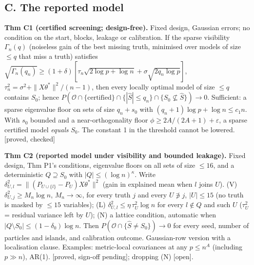 \documentclass[10pt]{article}
\newcommand{\st}[1]{\textsf{\small[#1]}}
\newcommand{\Shat}{\hat S}
\begin{document}
\subsection*{C. The reported model}
\textbf{Thm C1 (certified screening; design-free).} Fixed design, Gaussian errors; no condition on the start, blocks, leakage or calibration. If the sparse visibility $\Gamma_n(q)$ (noiseless gain of the best missing truth, minimised over models of size $\le q$ that miss a truth) satisfies $\sqrt{\Gamma_n(q_n)}\ge(1+\delta)[\tau_n\sqrt{2\log p+\log n}+\sigma\sqrt{2q_n\log p}]$, $\tau_n^2=\sigma^2+\|X\theta^*\|^2/(n-1)$, then every locally optimal model of size $\le q$ contains $S_0$; hence $P(\mathcal O\cap\{\text{certified}\}\cap\{|\Shat|\le q_n\}\cap\{S_0\not\subseteq\Shat\})\to0$. Sufficient: a sparse eigenvalue floor on sets of size $q_n+s_0$ with $(q_n+1)\log p+\log n\le c_1n$. With $s_0$ bounded and a near-orthogonality floor $\phi\ge 2A/(2A+1)+\varepsilon$, a sparse certified model \emph{equals} $S_0$. The constant 1 in the threshold cannot be lowered.
\st{proved, checked}

\textbf{Thm C2 (reported model under visibility and bounded leakage).} Fixed design, Thm P1's conditions, eigenvalue floors on all sets of size $\le16$, and a deterministic $Q\supseteq S_0$ with $|Q|\le(\log n)^\kappa$. Write $\delta^2_{U,l}=\|(P_{U\cup\{l\}}-P_U)X\theta^*\|^2$ (gain in explained mean when $l$ joins $U$). 
(V) $\delta^2_{U,j}\ge M_n\log n$, $M_n\to\infty$, for every truth $j$ and every $U\not\ni j$, $|U|\le15$ (no truth is masked by $\le15$ variables); (L) $\delta^2_{U,l}\le\eta\,\tau_U^2\log n$ for every $l\notin Q$ and such $U$ ($\tau_U^2$ = residual variance left by $U$); (N) a lattice condition, automatic when $|Q\setminus S_0|\le(1-\delta_0)\log n$.
Then $P(\mathcal O\cap\{\Shat\ne S_0\})\to0$ for every seed, number of particles and islands, and calibration outcome. Gaussian-row version with a localisation clause. Examples: metric-local covariances at any $p\le n^A$ (including $p\gg n$), AR(1).
\st{proved, sign-off pending}; dropping (N) \st{open}.
\end{document}
